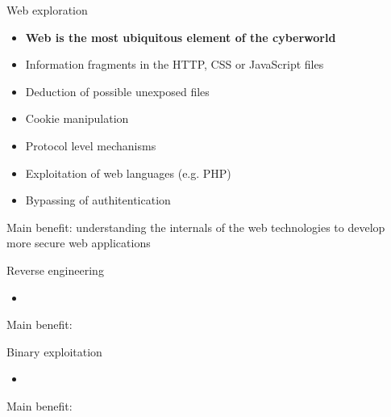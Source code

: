 \documentclass[12 pt]{beamer}
\begin{document}

\begin{frame}{Web exploration}

  \begin{itemize}
    \item{\textbf{Web is the most ubiquitous element of the cyberworld}}
    \item{Information fragments in the HTTP, CSS or JavaScript files}
    \item{Deduction of possible unexposed files}
    \item{Cookie manipulation}
    \item{Protocol level mechanisms}
    \item{Exploitation of web languages (e.g. PHP)}
    \item{Bypassing of authitentication}
  \end{itemize}

  \begin{exampleblock}{}
    Main benefit: understanding the internals of the web technologies to develop more secure web applications
  \end{exampleblock}
\end{frame}


\begin{frame}{Reverse engineering}

  \begin{itemize}
    \item{}
  \end{itemize}

  \begin{exampleblock}{}
    Main benefit: 
  \end{exampleblock}

\end{frame}

\begin{frame}{Binary exploitation}

  \begin{itemize}
    \item{}
  \end{itemize}

  \begin{exampleblock}{}
    Main benefit: 
  \end{exampleblock}

\end{frame}
\end{document}

